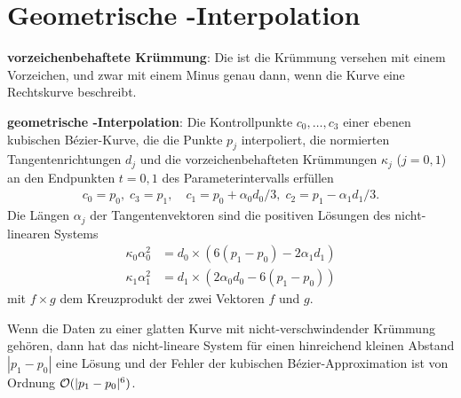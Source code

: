 \section{%
    Geometrische -Interpolation%
}

\textbf{vorzeichenbehaftete Krümmung}:
Die  ist die Krümmung versehen mit einem Vorzeichen,
und zwar mit einem Minus genau dann, wenn die Kurve eine Rechtskurve beschreibt.

\linie

\textbf{geometrische -Interpolation}:
Die Kontrollpunkte $c_0, \dotsc, c_3$ einer ebenen kubischen Bézier-Kurve, die die Punkte $p_j$
interpoliert, die normierten Tangentenrichtungen $d_j$ und die vorzeichenbehafteten Krümmungen
$\kappa_j$ ($j = 0, 1$) an den Endpunkten $t = 0, 1$ des Parameterintervalls erfüllen
\begin{align*}
    c_0 = p_0,\; c_3 = p_1,\quad
    c_1 = p_0 + \alpha_0 d_0 / 3,\; c_2 = p_1 - \alpha_1 d_1 / 3.
\end{align*}
Die Längen $\alpha_j$ der Tangentenvektoren sind die positiven Lösungen des nicht-linearen Systems
\begin{align*}
    \kappa_0 \alpha_0^2 &= d_0 \times (6(p_1 - p_0) - 2 \alpha_1 d_1)\\
    \kappa_1 \alpha_1^2 &= d_1 \times (2 \alpha_0 d_0 - 6(p_1 - p_0))
\end{align*}
mit $f \times g$ dem Kreuzprodukt der zwei Vektoren $f$ und $g$.

Wenn die Daten zu einer glatten Kurve mit nicht-verschwindender Krümmung gehören,
dann hat das nicht-lineare System für einen hinreichend kleinen Abstand $|p_1 - p_0|$ eine Lösung
und der Fehler der kubischen Bézier-Approximation ist von Ordnung $\mathcal{O}(|p_1 - p_0|^6)$.

\pagebreak
